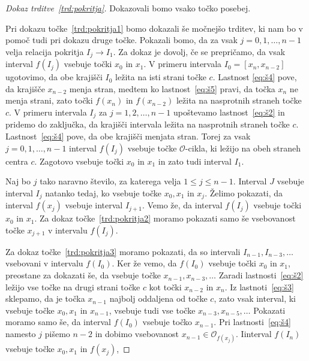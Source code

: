 \documentclass[mat2]{fmfdelo}
\begin{document}
\begin{proof}[Dokaz trditve~\ref{trd:pokritja}]
Dokazovali bomo vsako točko posebej. 

Pri dokazu točke~\ref{trd:pokritja1} bomo dokazali še močnejšo trditev, ki nam bo v pomoč tudi pri dokazu druge točke. Pokazali bomo, da za vsak $j = 0, 1, \dots, n-1$ velja relacija pokritja $I_j \to I_1$.  Za dokaz je dovolj, če se prepričamo, da vsak interval $f(I_j)$ vsebuje točki $x_0$ in $x_1$. V primeru intervala $I_0 = [x_n, x_{n-2}]$ ugotovimo, da obe krajišči $I_0$ ležita na isti strani točke $c$. Lastnost \ref{eq:š4} pove, da krajišče $x_{n-2}$ menja stran, medtem ko lastnost~\ref{eq:š5} pravi, da točka $x_n$ ne menja strani, zato točki $f(x_n)$ in $f(x_{n-2})$ ležita na nasprotnih straneh točke $c$. V primeru intervala $I_j$ za $j = 1, 2, \dots, n-1$ upoštevamo lastnost~\ref{eq:š2} in pridemo do zaključka, da krajišči intervala ležita na nasprotnih straneh točke $c$. Lastnost~\ref{eq:š4} pove, da obe krajišči menjata stran. Torej za vsak $j=0, 1, \dots, n-1$ interval $f(I_j)$ vsebuje točke $\mathcal{O}$-cikla, ki ležijo na obeh straneh centra $c$. Zagotovo vsebuje točki $x_0$ in $x_1$ in zato tudi interval $I_1$.

Naj bo $j$ tako naravno število, za katerega velja $1 \leq j \leq n-1$. Interval $J$ vsebuje interval $I_j$ natanko tedaj, ko vsebuje točke $x_0, x_1$ in $x_j$. Želimo pokazati, da interval $f(x_j)$ vsebuje interval $I_{j+1}$. Vemo že, da interval $f(I_j)$ vsebuje točki $x_0$ in $x_1$. Za dokaz točke~\ref{trd:pokritja2} moramo pokazati samo še vsebovanost točke $x_{j+1}$ v intervalu $f(I_j)$.

Za dokaz točke~\ref{trd:pokritja3} moramo pokazati, da so intervali $I_{n-1}, I_{n-3}, \dots$ vsebovani v intervalu $f(I_0)$.  
Ker že vemo, da $f(I_0)$ vsebuje točki $x_0$ in $x_1$, preostane za dokazati še, da vsebuje točke $x_{n-1}, x_{n-3}, \dots$ Zaradi lastnosti~\ref{eq:š2} ležijo vse točke na drugi strani točke $c$ kot točki $x_{n-2}$ in $x_n$. Iz lastnoti~\ref{eq:š3} sklepamo, da je točka $x_{n-1}$ najbolj oddaljena od točke $c$, zato vsak interval, ki vsebuje točke $x_0, x_1$ in $x_{n-1}$, vsebuje tudi vse točke $x_{n-3}, x_{n-5}, \dots$ Pokazati moramo samo še, da interval $f(I_0)$ vsebuje točko $x_{n-1}$. Pri lastnosti~\ref{eq:š4} namesto $j$ pišemo $n-2$ in dobimo vsebovanost $x_{n-1} \in \mathcal{O}_{f(x_j)}$. Iinterval $f(I_n)$ vsebuje točke $x_0, x_1$ in $f(x_j)$, 

\end{proof}
\end{document}
